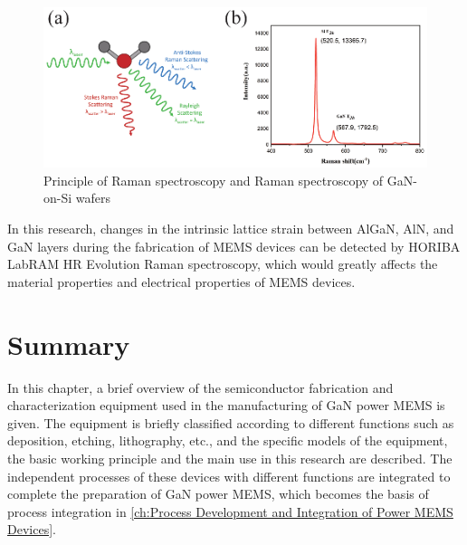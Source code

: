 \begin{figure}[H] 
\centering    
\includegraphics[width=1\textwidth]{ramanGaN}
\caption[Principle of Raman spectroscopy and Raman spectroscopy of GaN-on-Si wafers]{Principle of Raman spectroscopy and Raman spectroscopy of GaN-on-Si wafers}
\label{fig:ramangan}
\end{figure}

In this research, changes in the intrinsic lattice strain between AlGaN, AlN, and GaN layers during the fabrication of MEMS devices can be detected by HORIBA LabRAM HR Evolution Raman spectroscopy, which would greatly affects the material properties and electrical properties of MEMS devices.


\section{Summary}

In this chapter, a brief overview of the semiconductor fabrication and characterization equipment used in the manufacturing of GaN power MEMS is given. The equipment is briefly classified according to different functions such as deposition, etching, lithography, etc., and the specific models of the equipment, the basic working principle and the main use in this research are described. The independent processes of these devices with different functions are integrated to complete the preparation of GaN power MEMS, which becomes the basis of process integration in \autoref{ch:Process Development and Integration of Power MEMS Devices}.



